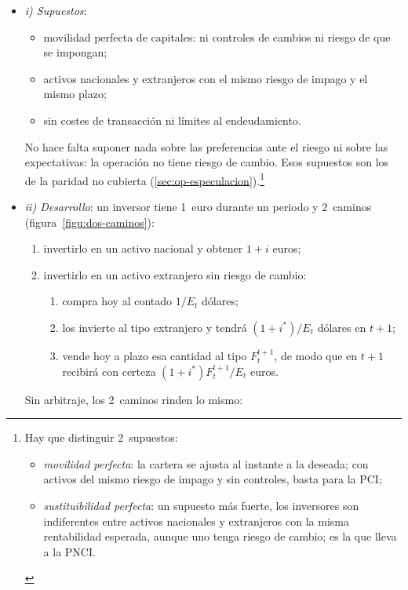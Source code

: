 \documentclass[11pt]{article}
\begin{document}
\begin{itemize}
\item \emph{i) Supuestos}:
  \begin{itemize}
  \item movilidad perfecta de capitales: ni controles de cambios ni riesgo de que se impongan;
  \item activos nacionales y extranjeros con el mismo riesgo de impago y el mismo plazo;
  \item sin costes de transacción ni límites al endeudamiento.
  \end{itemize}
  No hace falta suponer nada sobre las preferencias ante el riesgo ni sobre las expectativas: la operación no tiene riesgo de cambio. Esos supuestos son los de la paridad no cubierta (\ref{sec:op-especulacion}).\footnote{Hay que distinguir 2~supuestos:
\begin{itemize}
\item \emph{movilidad perfecta}: la cartera se ajusta al instante a la deseada; con activos del mismo riesgo de impago y sin controles, basta para la PCI;
\item \emph{sustituibilidad perfecta}: un supuesto más fuerte, los inversores son indiferentes entre activos nacionales y extranjeros con la misma rentabilidad esperada, aunque uno tenga riesgo de cambio; es la que lleva a la PNCI.
\end{itemize}}
\item \emph{ii) Desarrollo}: un inversor tiene 1~euro durante un periodo y 2~caminos (figura~\ref{figu:dos-caminos}):
  \begin{enumerate}
  \item invertirlo en un activo nacional y obtener $1+i$ euros;
  \item invertirlo en un activo extranjero sin riesgo de cambio:
    \begin{enumerate}
    \item compra hoy al contado $1/E_t$ dólares;
    \item los invierte al tipo extranjero y tendrá $(1+i^{*})/E_t$ dólares en $t+1$;
    \item vende hoy a plazo esa cantidad al tipo $F_t^{t+1}$, de modo que en $t+1$ recibirá con certeza $(1+i^{*})F_t^{t+1}/E_t$ euros.
    \end{enumerate}
  \end{enumerate}
  Sin arbitraje, los 2~caminos rinden lo mismo:

\end{itemize}
\end{document}
